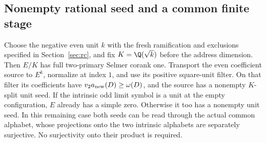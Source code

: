 \subsection{Nonempty rational seed and a common finite stage}
\begin{proposition}\label{ex:app-nonempty-seeds}
Choose the negative even unit $k$ with the fresh ramification and
exclusions specified in Section~\ref{sec:rc}, and fix
$K=\Q(\sqrt{k})$ before the address dimension. Then $E/K$ has full
two-primary Selmer corank one. Transport the even coefficient source
to $E^k$, normalize at index $1$, and use its positive square-unit
filter. On that filter its coefficients have
$v_2a_{\rm new}(D)\ge\omega(D)$, and the source has a nonempty
$K$-split unit seed.
If the intrinsic odd limit symbol is a unit at the empty
configuration, $E$ already has a simple zero. Otherwise it too has
a nonempty unit seed. In this remaining case both seeds can be
read through the actual common alphabet, whose projections onto
the two intrinsic alphabets are separately surjective. No
surjectivity onto their product is required.
\end{proposition}
